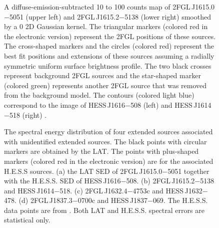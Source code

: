 \documentclass[12pt,preprint]{aastex}
\newif\ifcolorfigure
\newcommand{\gev}{\text{GeV}\xspace}
\newcommand{\tev}{\text{TeV}\xspace}
\begin{document}
\begin{figure}
    \ifcolorfigure
      \plotone{source_plots/source_HESS_J1614-518_color.eps}
    \else
    \fi
  \caption{
    A diffuse-emission-subtracted 10 \gev to 100 \gev counts
    map of 2FGL\,J1615.0$-$5051 (upper left)
    and 2FGL\,J1615.2$-$5138 (lower right) smoothed by a 0
    2D Gaussian kernel.  The triangular markers (colored red in the
    electronic version) represent the 2FGL positions of these sources.
    The cross-shaped markers and the
    circles (colored red) represent the best fit
    positions and extensions of these sources assuming a radially
    symmetric uniform surface brightness profile.  
    The two black crosses represent  background 2FGL sources and
    the star-shaped
    marker (colored green) represents another 2FGL source that was removed from the background
    model.  The contours (colored light blue) correspond to the \tev
    image of HESS\,J1616$-$508 (left) and HESS\,J1614$-$518 (right)
    \citep{hess_plane_survey}.   
    }\label{1FGL_J1613.6-5100c}
\end{figure}


\clearpage
\begin{figure}
    \ifcolorfigure
      \plotone{summary_plots/hess_seds_color.eps}
    \else
    \fi
    \caption{
    The spectral energy distribution of four extended
    sources associated with unidentified
    extended \tev sources.  The black points
    with circular markers are obtained by the LAT. The points with
    plus-shaped markers (colored red in the electronic version) are
    for the associated H.E.S.S sources.  (a) the
    LAT SED of 2FGL\,J1615.0$-$5051 together with the H.E.S.S. SED
    of HESS\,J1616$-$508. (b) 2FGL\,J1615.2$-$5138
    and HESS\,J1614$-$518. (c) 2FGL\,J1632.4$-$4753c
    and HESS\,J1632$-$478. (d) 2FGL\,J1837.3$-$0700c
    and HESS\,J1837$-$069. The H.E.S.S. data points are from
    \citep{hess_plane_survey}. Both LAT and H.E.S.S. spectral errors are
    statistical only.}
    \label{hess_seds}
  \end{figure}
\end{document}
